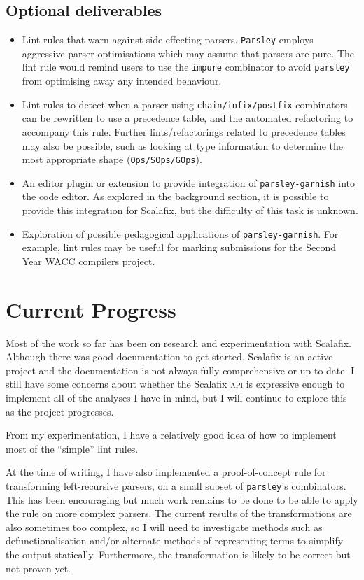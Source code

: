 \documentclass[../../main.tex]{subfiles}
\begin{document}
\subsection{Optional deliverables}
\begin{itemize}
  \item
  Lint rules that warn against side-effecting parsers.
  \texttt{Parsley} employs aggressive parser optimisations which may assume that parsers are pure.
  The lint rule would remind users to use the \texttt{impure} combinator to avoid \texttt{parsley} from optimising away any intended behaviour.
  \item
  Lint rules to detect when a parser using \texttt{chain/infix/postfix} combinators can be rewritten to use a precedence table, and the automated refactoring to accompany this rule.
  Further lints/refactorings related to precedence tables may also be possible, such as looking at type information to determine the most appropriate shape (\texttt{Ops/SOps/GOps}).
  \item
  An editor plugin or extension to provide integration of \texttt{parsley-garnish} into the code editor.
  As explored in the background section, it is possible to provide this integration for Scalafix, but the difficulty of this task is unknown.
  \item
  Exploration of possible pedagogical applications of \texttt{parsley-garnish}.
  For example, lint rules may be useful for marking submissions for the Second Year WACC compilers project.
\end{itemize}

\section{Current Progress}
Most of the work so far has been on research and experimentation with Scalafix.
Although there was good documentation to get started, Scalafix is an active project and the documentation is not always fully comprehensive or up-to-date.
I still have some concerns about whether the Scalafix \textsc{api} is expressive enough to implement all of the analyses I have in mind, but I will continue to explore this as the project progresses.

From my experimentation, I have a relatively good idea of how to implement most of the ``simple'' lint rules.

At the time of writing, I have also implemented a proof-of-concept rule for transforming left-recursive parsers, on a small subset of \texttt{parsley}'s combinators.
This has been encouraging but much work remains to be done to be able to apply the rule on more complex parsers.
The current results of the transformations are also sometimes too complex, so I will need to investigate methods such as defunctionalisation and/or alternate methods of representing terms to simplify the output statically.
Furthermore, the transformation is likely to be correct but not proven yet.
\end{document}
